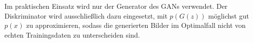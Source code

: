 Im praktischen Einsatz wird nur der Generator des \acp{GAN} verwendet. Der Diskriminator wird ausschließlich dazu eingesetzt, mit $p(G(z))$ möglichst gut $p(x)$ zu approximieren, sodass die generierten Bilder im Optimalfall nicht von echten Trainingsdaten zu unterscheiden sind. \cite{visualApproach}








